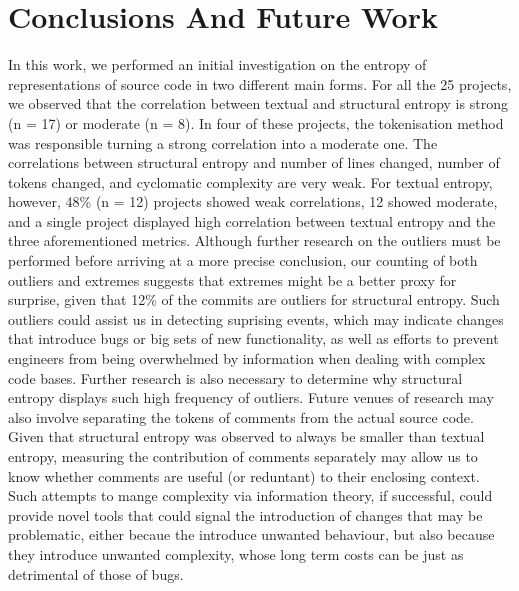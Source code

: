 \documentclass[10pt,conference]{IEEEtran}
\begin{document}
\section{Conclusions And Future Work}
In this work, we performed an initial investigation on the entropy of representations of source code in two different main forms. For all the 25 projects, we observed that the correlation between textual and structural entropy is strong (n = 17) or moderate (n = 8). In four of these projects, the tokenisation method was responsible turning a strong correlation into a moderate one. The correlations between structural entropy and number of lines changed, number of tokens changed, and cyclomatic complexity are very weak. For textual entropy, however, 48\% (n = 12) projects showed weak correlations, 12 showed moderate, and a single project displayed high correlation between textual entropy and the three aforementioned metrics.
Although further research on the outliers must be performed before arriving at a more precise conclusion, our counting of both outliers and extremes suggests that extremes might be a better proxy for surprise, given that 12\% of the commits are outliers for structural entropy. Such outliers could assist us in detecting suprising events, which may indicate changes that introduce bugs or big sets of new functionality, as well as efforts to prevent engineers from being overwhelmed by information when dealing with complex code bases.
Further research is also necessary to determine why structural entropy displays such high frequency of outliers.
Future venues of research may also involve separating the tokens of comments from the actual source code. Given that structural entropy was observed to always be smaller than textual entropy, measuring the contribution of comments separately may allow us to know whether comments are useful (or reduntant) to their enclosing context. Such attempts to mange complexity via information theory, if successful, could provide novel tools that could signal the introduction of changes that may be problematic, either becaue the introduce unwanted behaviour, but also because they introduce unwanted complexity, whose long term costs can be just as detrimental of those of bugs.


\end{document}
